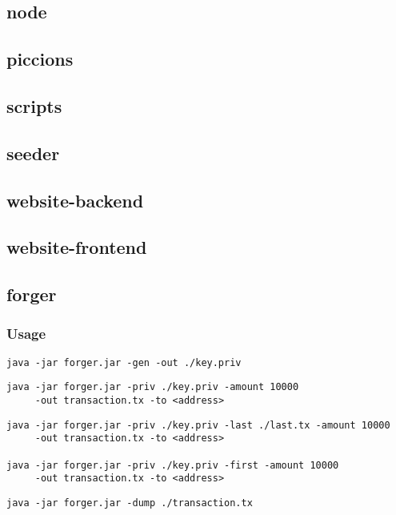 \documentclass[../documentation.tex]{subfiles}
\begin{document}

\subsection{node}


\subsection{piccions}


\subsection{scripts}


\subsection{seeder}


\subsection{website-backend}


\subsection{website-frontend}


\subsection{forger}

\subsubsection{Usage}

\begin{lstlisting}[style=generic]
java -jar forger.jar -gen -out ./key.priv
\end{lstlisting}

\begin{lstlisting}[style=generic]
java -jar forger.jar -priv ./key.priv -amount 10000
     -out transaction.tx -to <address>
\end{lstlisting}

\begin{lstlisting}[style=generic]
java -jar forger.jar -priv ./key.priv -last ./last.tx -amount 10000
     -out transaction.tx -to <address>

java -jar forger.jar -priv ./key.priv -first -amount 10000
     -out transaction.tx -to <address>
\end{lstlisting}

\begin{lstlisting}[style=generic]
java -jar forger.jar -dump ./transaction.tx
\end{lstlisting}
\end{document}
